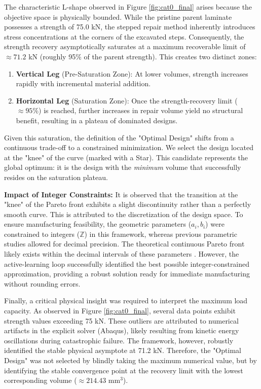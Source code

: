 \documentclass[
  preprint,
  12pt,
  a4paper
]{elsarticle}
\newcommand{\new}[1]{#1}
\begin{document}
The characteristic L-shape observed in Figure \ref{fig:cat0_final} arises because the objective space is physically bounded. While the pristine parent laminate possesses a strength of 75.0 kN, the stepped repair method inherently introduces stress concentrations at the corners of the excavated steps. Consequently, the strength recovery asymptotically saturates at a maximum recoverable limit of $\approx 71.2$ kN (roughly 95\% of the parent strength). This creates two distinct zones:
\begin{enumerate}
    \item \textbf{Vertical Leg} \new{(Pre-Saturation Zone)}: At lower volumes, strength increases rapidly with incremental material addition.
    \item \textbf{Horizontal Leg} (Saturation Zone): Once the \new{strength-recovery limit} ($\approx 95\%$) is reached, further increases in repair volume yield no structural benefit, resulting in a plateau of dominated designs.
\end{enumerate}

Given this saturation, the definition of the "Optimal Design" shifts from a continuous trade-off to a constrained minimization. We select the design located at the "knee" of the curve (marked with a Star). This candidate represents the global optimum: it is the design with the \textit{minimum} volume that successfully resides on the saturation plateau.

\textbf{Impact of Integer Constraints:}
It is observed that the transition at the "knee" of the Pareto front exhibits a slight discontinuity rather than a perfectly smooth curve. This is attributed to the discretization of the design space. To ensure manufacturing feasibility, the geometric parameters ($a_i, b_i$) were constrained to integers ($\mathbb{Z}$) in this framework, whereas previous parametric studies \cite{psarras2024design} allowed for decimal precision. The theoretical continuous Pareto front likely exists within the decimal intervals of these parameters . However, the \new{active-learning loop} successfully identified the best possible integer-constrained approximation, providing a robust solution ready for immediate manufacturing without rounding errors.

Finally, a critical physical insight was required to interpret the maximum load capacity. As observed in Figure \ref{fig:cat0_final}, several data points exhibit strength values exceeding 75 kN. These outliers are attributed to numerical artifacts in the explicit solver (Abaqus), likely resulting from kinetic energy oscillations during catastrophic failure. The framework, however, robustly identified the stable physical asymptote at 71.2 kN. Therefore, the "Optimal Design" was not selected by blindly taking the maximum numerical value, but by identifying the stable convergence point at the recovery limit with the lowest corresponding volume ($\approx 214.43$ mm$^3$).
\end{document}
